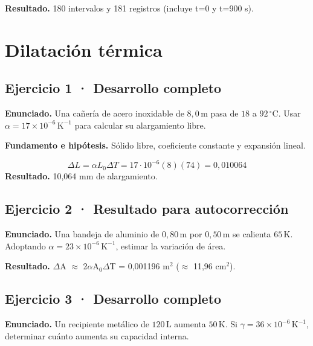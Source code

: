 \documentclass[11pt,a4paper]{article}
\begin{document}
\textbf{Resultado.} 180 intervalos y 181 registros (incluye t=0 y t=900 s).


\clearpage

\section{Dilatación térmica}

\begin{center}\end{center}

\subsection*{Ejercicio 1 · Desarrollo completo}
\textbf{Enunciado.} Una cañería de acero inoxidable de \(8{,}0\,\mathrm m\) pasa de \(18\) a \(92\,^\circ\mathrm C\). Usar \(\alpha=17\times10^{-6}\,\mathrm K^{-1}\) para calcular su alargamiento libre.

\textbf{Fundamento e hipótesis.} Sólido libre, coeficiente constante y expansión lineal.

\[
\Delta L=\alpha L_0\Delta T=17\cdot10^{-6}(8)(74)=0{,}010064
\]
\textbf{Resultado.} 10,064 mm de alargamiento.


\subsection*{Ejercicio 2 · Resultado para autocorrección}
\textbf{Enunciado.} Una bandeja de aluminio de \(0{,}80\,\mathrm m\) por \(0{,}50\,\mathrm m\) se calienta \(65\,\mathrm K\). Adoptando \(\alpha=23\times10^{-6}\,\mathrm K^{-1}\), estimar la variación de área.

\textbf{Resultado.} \ensuremath{\Delta}A \ensuremath{\approx} 2\ensuremath{\alpha}A\ensuremath{_0}\ensuremath{\Delta}T = 0,001196 m\ensuremath{^2} (\ensuremath{\approx} 11,96 cm\ensuremath{^2}).


\subsection*{Ejercicio 3 · Desarrollo completo}
\textbf{Enunciado.} Un recipiente metálico de \(120\,\mathrm L\) aumenta \(50\,\mathrm K\). Si \(\gamma=36\times10^{-6}\,\mathrm K^{-1}\), determinar cuánto aumenta su capacidad interna.
\end{document}
